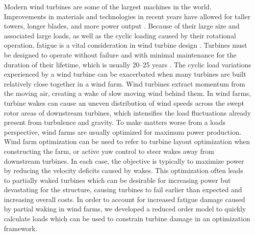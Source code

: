 \documentclass[11pt,letterpaper]{article}
\begin{document}
Modern wind turbines are some of the largest machines in the world. Improvements in materials and technologies in recent years have allowed for taller towers, longer blades, and more power output \cite{wiser2016reducing,enevoldsen2019examining}. Because of their large size and associated large loads, as well as the cyclic loading caused by their rotational operation, fatigue is a vital consideration in wind turbine design \cite{hubler2019validation}. Turbines must be designed to operate without failure and with minimal maintenance for the duration of their lifetime, which is usually 20--25 years \cite{hu2016reliability,ziegler2018lifetime}. The cyclic load variations experienced by a wind turbine can be exacerbated when many turbines are built relatively close together in a wind farm. Wind turbines extract momentum from the moving air, creating a wake of slow moving wind behind them. In wind farms, turbine wakes can cause an uneven distribution of wind speeds across the swept rotor areas of downstream turbines, which intensifies the load fluctuations already present from turbulence and gravity. To make matters worse from a loads perspective, wind farms are usually optimized for maximum power production. Wind farm optimization can be used to refer to turbine layout optimization when constructing the farm, or active yaw control to steer wakes away from downstream turbines. In each case, the objective is typically to maximize power by reducing the velocity deficits caused by wakes. This optimization often leads to partially waked turbines which can be desirable for increasing power but devastating for the structure, causing turbines to fail earlier than expected and increasing overall costs. In order to account for increased fatigue damage caused by partial waking in wind farms, we developed a reduced order model to quickly calculate loads which can be used to constrain turbine damage in an optimization framework. 
\end{document}
